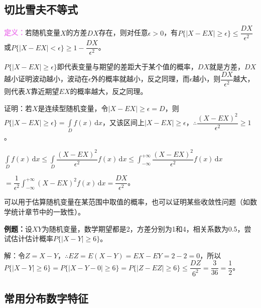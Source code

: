 \subsection{切比雪夫不等式}

\textcolor{violet}{\textbf{定义：}}若随机变量$X$的方差$DX$存在，则对任意$\epsilon>0$，有$P\{\vert X-EX\vert\geqslant\epsilon\}\leqslant\dfrac{DX}{\epsilon^2}$或$P\{\vert X-EX\vert<\epsilon\}\geqslant1-\dfrac{DX}{\epsilon^2}$。

$P\{\vert X-EX\vert\geqslant\epsilon\}$即代表变量与期望的差距大于某个值的概率，$DX$就是方差，$DX$越小证明波动越小，波动在$\epsilon$外的概率就越小，反之同理，而$\epsilon$越小，则$\dfrac{DX}{\epsilon^2}$越大，则代表$X$靠近期望$EX$的概率越大，反之同理。

证明：若$X$是连续型随机变量，令$\vert X-EX\vert\geqslant\epsilon=D$，则$P\{\vert X-EX\vert\geqslant\epsilon\}=\int\limits_Df(x)\,\textrm{d}x$，又该区间上$\vert X-EX\vert\geqslant\epsilon$，$\therefore\dfrac{(X-EX)^2}{\epsilon^2}\geqslant 1$。

$\displaystyle{\int\limits_Df(x)\,\textrm{d}x\leqslant\int\limits_D\dfrac{(X-EX)^2}{\epsilon^2}f(x)\,\textrm{d}x\leqslant\int_{-\infty}^{+\infty}\dfrac{(X-EX)^2}{\epsilon^2}f(x)\,\textrm{d}x}$

$=\displaystyle{\dfrac{1}{\epsilon^2}\int_{-\infty}^{+\infty}(X-EX)^2f(x)\,\textrm{d}x}=\dfrac{DX}{\epsilon^2}$。

可以用于估算随机变量在某范围中取值的概率，也可以证明某些收敛性问题（如数学统计章节中的一致性）。

\textbf{例题：}设$XY$为随机变量，数学期望都是2，方差分别为1和4，相关系数为0.5，尝试估计估计概率$P\{\vert X-Y\vert\geqslant6\}$。

解：令$Z=X-Y$，$\therefore EZ=E(X-Y)=EX-EY=2-2=0$，所以$P\{\vert X-Y\vert\geqslant6\}=P\{\vert X-Y-0\vert\geqslant6\}=P\{\vert Z-EZ\vert\geqslant6\}\leqslant\dfrac{DZ}{6^2}=\dfrac{3}{36}=\dfrac{1}{2}$。

\subsection{常用分布数字特征}

